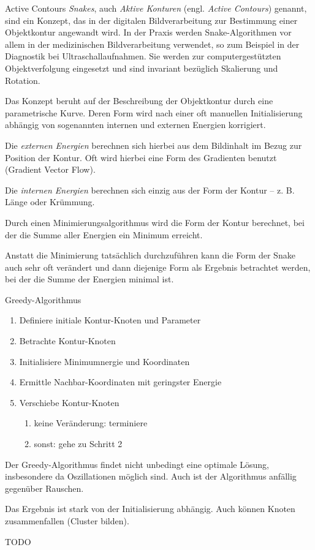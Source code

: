 \begin{defi}{Active Contours}
    \emph{Snakes}, auch \emph{Aktive Konturen} (engl. \emph{Active Contours}) genannt, sind ein Konzept, das in der digitalen Bildverarbeitung zur Bestimmung einer Objektkontur angewandt wird.
    In der Praxis werden Snake-Algorithmen vor allem in der medizinischen Bildverarbeitung verwendet, so zum Beispiel in der Diagnostik bei Ultraschallaufnahmen.
    Sie werden zur computergestützten Objektverfolgung eingesetzt und sind invariant bezüglich Skalierung und Rotation.

    Das Konzept beruht auf der Beschreibung der Objektkontur durch eine parametrische Kurve.
    Deren Form wird nach einer oft manuellen Initialisierung abhängig von sogenannten internen und externen Energien korrigiert.

    Die \emph{externen Energien} berechnen sich hierbei aus dem Bildinhalt im Bezug zur Position der Kontur.
    Oft wird hierbei eine Form des Gradienten benutzt (Gradient Vector Flow).

    Die \emph{internen Energien} berechnen sich einzig aus der Form der Kontur -- z. B. Länge oder Krümmung.

    Durch einen Minimierungsalgorithmus wird die Form der Kontur berechnet, bei der die Summe aller Energien ein Minimum erreicht.

    Anstatt die Minimierung tatsächlich durchzuführen kann die Form der Snake auch sehr oft verändert und dann diejenige Form als Ergebnis betrachtet werden, bei der die Summe der Energien minimal ist.
\end{defi}

\begin{defi}{Greedy-Algorithmus}
    \begin{enumerate}
        \item Definiere initiale Kontur-Knoten und Parameter
        \item Betrachte Kontur-Knoten
        \item Initialisiere Minimumnergie und Koordinaten
        \item Ermittle Nachbar-Koordinaten mit geringster Energie
        \item Verschiebe Kontur-Knoten
              \begin{enumerate}
                  \item keine Veränderung: terminiere
                  \item sonst: gehe zu Schritt 2
              \end{enumerate}
    \end{enumerate}

    Der Greedy-Algorithmus findet nicht unbedingt eine optimale Lösung, insbesondere da Oszillationen möglich sind.
    Auch ist der Algorithmus anfällig gegenüber Rauschen.

    Das Ergebnis ist stark von der Initialisierung abhängig.
    Auch können Knoten zusammenfallen (Cluster bilden).

    TODO
\end{defi}

